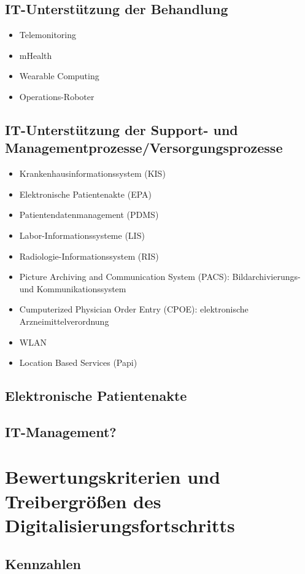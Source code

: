 	\subsection{IT-Unterstützung der Behandlung}
	\parencite[51]{oswald2019} \parencite[14]{braeutigam2017}
	\begin{itemize}
		\item Telemonitoring
		\item mHealth
		\item Wearable Computing
		\item Operations-Roboter
	\end{itemize}
	\subsection{IT-Unterstützung der Support- und Managementprozesse/Versorgungsprozesse}
	\parencite{oswald2019} \parencite[14]{braeutigam2017}
	\begin{itemize}
		\item Krankenhausinformationssystem (KIS)
		\item Elektronische Patientenakte (EPA)
		\item Patientendatenmanagement (PDMS)
		\item Labor-Informationssysteme (LIS)
		\item Radiologie-Informationssystem (RIS)
		\item Picture Archiving and Communication System (PACS): Bildarchivierungs- und Kommunikationssystem
		\item Cumputerized Physician Order Entry (CPOE): elektronische Arzneimittelverordnung
		\item WLAN
		\item Location Based Services (Papi)
	\end{itemize}
	\subsection{Elektronische Patientenakte}
	\subsection{IT-Management?}
\section{Bewertungskriterien und Treibergrößen des Digitalisierungsfortschritts}
	\subsection{Kennzahlen}
